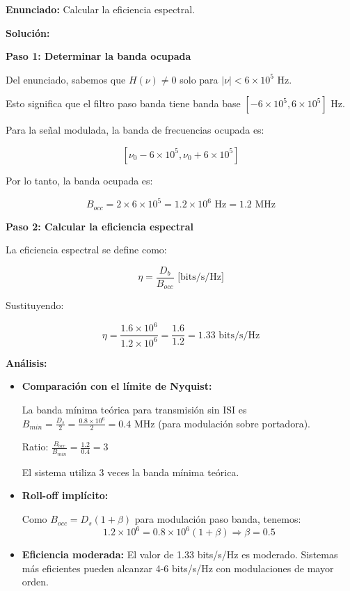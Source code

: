 \documentclass[11pt,a4paper]{article}
\begin{document}
\textbf{Enunciado:} Calcular la eficiencia espectral.

\vspace{0.3cm}
\textbf{Soluci\'on:}

\textbf{Paso 1: Determinar la banda ocupada}

Del enunciado, sabemos que $H(\nu) \neq 0$ solo para $|\nu| < 6 \times 10^5$ Hz.

Esto significa que el filtro paso banda tiene banda base $[-6 \times 10^5, 6 \times 10^5]$ Hz.

Para la se\~nal modulada, la banda de frecuencias ocupada es:

\[
[\nu_0 - 6 \times 10^5, \nu_0 + 6 \times 10^5]
\]

Por lo tanto, la banda ocupada es:

\[
B_{occ} = 2 \times 6 \times 10^5 = 1.2 \times 10^6 \text{ Hz} = 1.2 \text{ MHz}
\]

\textbf{Paso 2: Calcular la eficiencia espectral}

La eficiencia espectral se define como:

\[
\eta = \frac{D_b}{B_{occ}} \text{ [bits/s/Hz]}
\]

Sustituyendo:

\[
\eta = \frac{1.6 \times 10^6}{1.2 \times 10^6} = \frac{1.6}{1.2} = \boxed{1.33 \text{ bits/s/Hz}}
\]

\textbf{An\'alisis:}

\begin{itemize}
    \item \textbf{Comparaci\'on con el l\'imite de Nyquist:} 
    
    La banda m\'inima te\'orica para transmisi\'on sin ISI es $B_{min} = \frac{D_s}{2} = \frac{0.8 \times 10^6}{2} = 0.4$ MHz (para modulaci\'on sobre portadora).
    
    Ratio: $\frac{B_{occ}}{B_{min}} = \frac{1.2}{0.4} = 3$
    
    El sistema utiliza 3 veces la banda m\'inima te\'orica.
    
    \item \textbf{Roll-off impl\'icito:} 
    
    Como $B_{occ} = D_s(1 + \beta)$ para modulaci\'on paso banda, tenemos:
    \[
    1.2 \times 10^6 = 0.8 \times 10^6 (1 + \beta) \Rightarrow \beta = 0.5
    \]
    
    \item \textbf{Eficiencia moderada:} El valor de 1.33 bits/s/Hz es moderado. Sistemas m\'as eficientes pueden alcanzar 4-6 bits/s/Hz con modulaciones de mayor orden.
\end{itemize}
\end{document}
